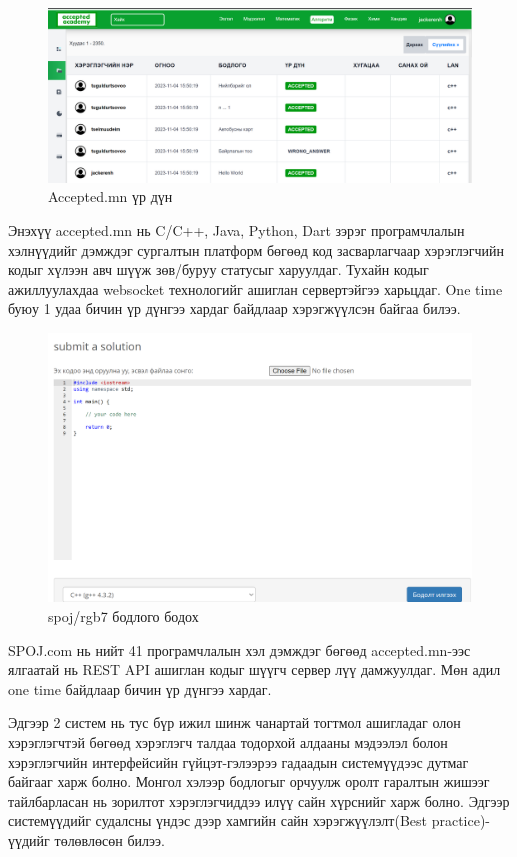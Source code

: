 \begin{figure}[h]
  \centering
  \includegraphics[width=15cm]{img/accepted-judger.PNG}
  \caption{Accepted.mn үр дүн}
\end{figure}

Энэхүү accepted.mn\cite{acceptedmn} нь C/C++, Java, Python, Dart зэрэг програмчлалын хэлнүүдийг дэмждэг сургалтын платформ бөгөөд код засварлагчаар хэрэглэгчийн кодыг хүлээн авч шүүж зөв/буруу статусыг харуулдаг. Тухайн кодыг ажиллуулахдаа websocket технологийг ашиглан сервертэйгээ харьцдаг. One time буюу 1 удаа бичин үр дүнгээ хардаг байдлаар хэрэгжүүлсэн байгаа билээ. 

\begin{figure}[h]
  \centering
  \includegraphics[width=15cm]{img/spoj.PNG}
  \caption{spoj/rgb7 бодлого бодох}
\end{figure}

SPOJ.com\cite{spojmn} нь нийт 41 програмчлалын хэл дэмждэг бөгөөд accepted.mn-ээс ялгаатай нь REST API ашиглан кодыг шүүгч сервер лүү дамжуулдаг. Мөн адил one time байдлаар бичин үр дүнгээ хардаг. 

Эдгээр 2 систем нь тус бүр ижил шинж чанартай тогтмол ашигладаг олон хэрэглэгчтэй бөгөөд хэрэглэгч талдаа тодорхой алдааны мэдээлэл болон хэрэглэгчийн интерфейсийн гүйцэт-гэлээрээ гадаадын системүүдээс дутмаг байгааг харж болно. Монгол хэлээр бодлогыг орчуулж оролт гаралтын жишээг тайлбарласан нь зорилтот хэрэглэгчиддээ илүү сайн хүрснийг харж болно. Эдгээр системүүдийг судалсны үндэс дээр хамгийн сайн хэрэгжүүлэлт(Best practice)-үүдийг төлөвлөсөн билээ.

